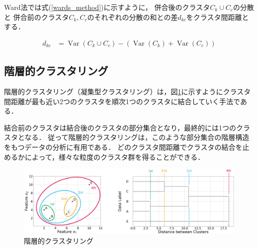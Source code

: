 \documentclass[12pt,a4j]{jreport}
\begin{document}
Ward法では式(\ref{wards_method})に示すように，
併合後のクラスタ$C_{k} \cup C_{c}$の分散と
併合前のクラスタ$C_{k}, C_{c}$のそれぞれの分散の和との差$d_{k c}$をクラスタ間距離とする．


\begin{align}
  d_{k c} &= \operatorname{Var} \left( C_{k} \cup C_{c} \right)
  -
  \left(
    \operatorname{Var}\left(C_{k}\right)
    +
    \operatorname{Var}\left(C_{c}\right)
  \right)
  \label{wards_method}
\end{align}



\subsection{階層的クラスタリング}
\label{subsection_hierarchical_clustering}
階層的クラスタリング（凝集型クラスタリング）は，図\ref{fig_clustering_example}に示すようにクラスタ間距離が最も近い2つのクラスタを順次1つのクラスタに結合していく手法である．

結合前のクラスタは結合後のクラスタの部分集合となり，最終的には1つのクラスタとなる．
従って階層的クラスタリングは，このような部分集合の階層構造をもつデータの分析に有用である．
どのクラスタ間距離でクラスタの結合を止めるかによって，様々な粒度のクラスタ群を得ることができる．

\begin{figure}[H]
	\centering
	\includegraphics[keepaspectratio, width=120mm]{img/clustering_example.png}
	\caption{階層的クラスタリング}
	\label{fig_clustering_example}
\end{figure}


\end{document}
